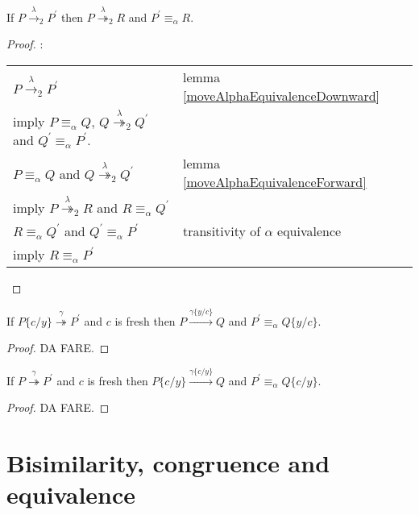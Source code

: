 \begin{lemma}\label{pushAlfaEquivalence}
  If $P\xrightarrow{\lambda}_{2} P^{'}$ then $P\stackrel{\lambda}{\twoheadrightarrow}_{2} R$ and $P^{'}\equiv_{\alpha} R$.
  \begin{proof}:
    \begin{center}
      \begin{tabular}{ll}
	    $P\xrightarrow{\lambda}_{2} P^{'}$ 
	  &
	    lemma \ref{moveAlphaEquivalenceDownward} 
	\\
	    imply $P\equiv_{\alpha}Q$, $Q\stackrel{\lambda}{\twoheadrightarrow}_{2} Q^{'}$ and $Q^{'}\equiv_{\alpha}P^{'}$.
	  &
	\\
	    $P\equiv_{\alpha}Q$ and $Q\stackrel{\lambda}{\twoheadrightarrow}_{2} Q^{'}$ 
	  &
	    lemma \ref{moveAlphaEquivalenceForward} 
	\\
	    imply $P\stackrel{\lambda}{\twoheadrightarrow}_{2} R$ and $R\equiv_{\alpha} Q^{'}$
	  &
	\\
	    $R\equiv_{\alpha} Q^{'}$ and $Q^{'}\equiv_{\alpha}P^{'}$
	  &
	    transitivity of $\alpha$ equivalence
	\\
	    imply $R\equiv_{\alpha}P^{'}$
	  &
      \end{tabular}
    \end{center}
  \end{proof}
\end{lemma}

\begin{lemma}\label{pushSubstitution}
  If $P\{c/y\} \stackrel{\gamma}{\twoheadrightarrow} P^{'}$ and $c$ is fresh then $P \xrightarrow{\gamma\{y/c\}} Q$ and $P^{'}\equiv_{\alpha}Q\{y/c\}$.
  \begin{proof}
    DA FARE.
  \end{proof}\end{lemma}

\begin{lemma}\label{substitutionOverTransition}
  If $P \stackrel{\gamma}{\twoheadrightarrow} P^{'}$ and $c$ is fresh then $P\{c/y\} \xrightarrow{\gamma\{c/y\}} Q$ and $P^{'}\equiv_{\alpha}Q\{c/y\}$.
  \begin{proof}
    DA FARE.
  \end{proof}\end{lemma}


\section{Bisimilarity, congruence and equivalence}

